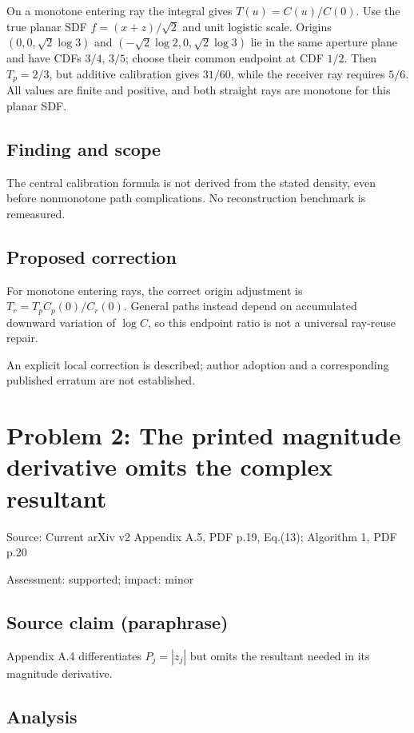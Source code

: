 \documentclass[11pt]{article}
\begin{document}
On a monotone entering ray the integral gives \(T(u)=C(u)/C(0)\). Use the true planar SDF \(f=(x+z)/\sqrt2\) and unit logistic scale. Origins \((0,0,\sqrt2\log3)\) and \((-\sqrt2\log2,0,\sqrt2\log3)\) lie in the same aperture plane and have CDFs \(3/4\), \(3/5\); choose their common endpoint at CDF \(1/2\). Then \(T_p=2/3\), but additive calibration gives \(31/60\), while the receiver ray requires \(5/6\). All values are finite and positive, and both straight rays are monotone for this planar SDF.

\subsection*{Finding and scope}

The central calibration formula is not derived from the stated density, even before nonmonotone path complications. No reconstruction benchmark is remeasured.

\subsection*{Proposed correction}

For monotone entering rays, the correct origin adjustment is \(T_r=T_pC_p(0)/C_r(0)\). General paths instead depend on accumulated downward variation of \(\log C\), so this endpoint ratio is not a universal ray-reuse repair.

An explicit local correction is described; author adoption and a corresponding published erratum are not established.

\section*{Problem 2: The printed magnitude derivative omits the complex resultant}

Source: Current arXiv v2 Appendix A.5, PDF p.19, Eq.(13); Algorithm 1, PDF p.20

Assessment: supported; impact: minor

\subsection*{Source claim (paraphrase)}

Appendix A.4 differentiates \(P_j=|z_j|\) but omits the resultant needed in its magnitude derivative.

\subsection*{Analysis}
\end{document}
